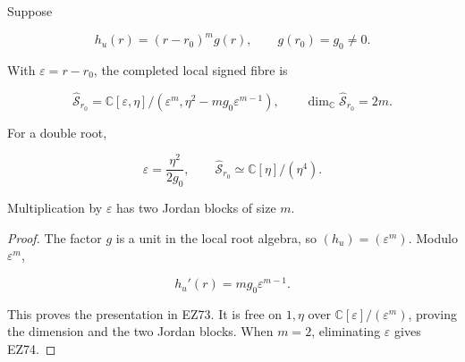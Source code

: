 \begin{theorem}
\label{thm:nilpotent-fibre}
Suppose

\[
 h_u(r)=(r-r_0)^m g(r),\qquad g(r_0)=g_0\ne0.
\]

With \(\varepsilon=r-r_0\), the completed local signed fibre is

\begin{equation}
 \boxed{
 \widehat{\mathcal S}_{r_0}
 =\mathbb C[\varepsilon,\eta]/
 (\varepsilon^m,\eta^2-mg_0\varepsilon^{m-1}),\qquad
 \dim_{\mathbb C}\widehat{\mathcal S}_{r_0}=2m.}      \tag{EZ73}
\end{equation}

For a double root,

\begin{equation}
 \varepsilon=\frac{\eta^2}{2g_0},\qquad
 \boxed{\widehat{\mathcal S}_{r_0}\simeq
 \mathbb C[\eta]/(\eta^4).}                          \tag{EZ74}
\end{equation}

Multiplication by \(\varepsilon\) has two Jordan blocks of size \(m\).
\end{theorem}

\begin{proof}
The factor \(g\) is a unit in the local root algebra, so
\((h_u)=(\varepsilon^m)\).  Modulo \(\varepsilon^m\),

\[
 h_u'(r)=mg_0\varepsilon^{m-1}.
\]

This proves the presentation in EZ73.  It is free on \(1,\eta\) over
\(\mathbb C[\varepsilon]/(\varepsilon^m)\), proving the dimension and the two
Jordan blocks.  When \(m=2\), eliminating \(\varepsilon\) gives EZ74.
\end{proof}

